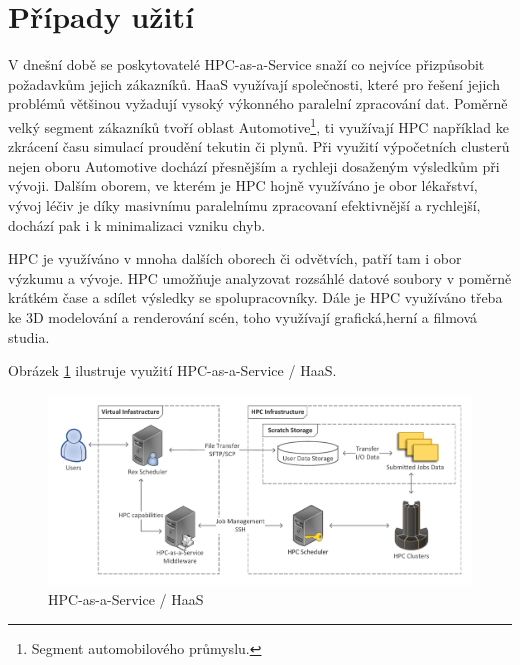 \section{Případy užití}
V dnešní době se poskytovatelé HPC-as-a-Service snaží co nejvíce přizpůsobit požadavkům jejich zákazníků. HaaS využívají společnosti, které pro řešení jejich problémů většinou vyžadují vysoký výkonného paralelní zpracování dat. Poměrně velký segment zákazníků tvoří oblast Automotive\footnote{Segment automobilového průmyslu.}, ti využívají HPC například ke zkrácení času simulací proudění tekutin či plynů. Při využití výpočetních clusterů nejen oboru Automotive dochází přesnějším a rychleji dosaženým výsledkům při vývoji. Dalším oborem, ve kterém je HPC hojně využíváno je obor lékařství, vývoj léčiv je díky masivnímu paralelnímu zpracovaní efektivnější a rychlejší, dochází pak i k minimalizaci vzniku chyb.

HPC je využíváno v mnoha dalších oborech či odvětvích, patří tam i obor výzkumu a vývoje. HPC umožňuje analyzovat rozsáhlé datové soubory v poměrně krátkém čase a sdílet výsledky se spolupracovníky. Dále je HPC využíváno třeba ke 3D modelování a renderování scén, toho využívají grafická,herní a filmová studia.

Obrázek \ref{fig:haas} ilustruje využití HPC-as-a-Service / HaaS.

\begin{figure}[!h]
	\centering
	\includegraphics[width=1\textwidth]{Figures/haas.pdf}
	\caption{HPC-as-a-Service / HaaS \cite{uG7wIvjQiIli6kO9}}
	\label{fig:haas}
\end{figure}